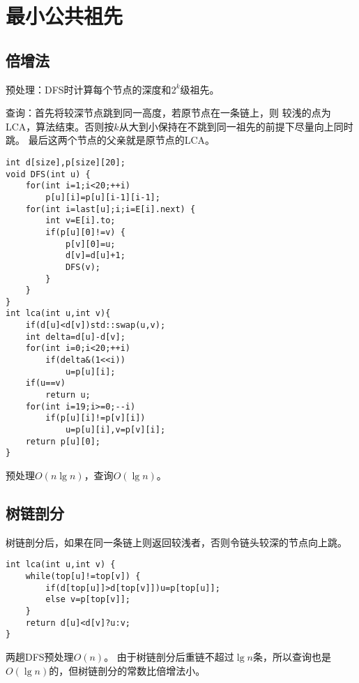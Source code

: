 \section{最小公共祖先}
\subsection{倍增法}
预处理：DFS时计算每个节点的深度和$2^k$级祖先。

查询：首先将较深节点跳到同一高度，若原节点在一条链上，则
较浅的点为LCA，算法结束。否则按$k$从大到小保持在不跳到同一祖先的前提下尽量向上同时跳。
最后这两个节点的父亲就是原节点的LCA。

\begin{lstlisting}
int d[size],p[size][20];
void DFS(int u) {
    for(int i=1;i<20;++i)
        p[u][i]=p[u][i-1][i-1];
    for(int i=last[u];i;i=E[i].next) {
        int v=E[i].to;
        if(p[u][0]!=v) {
            p[v][0]=u;
            d[v]=d[u]+1;
            DFS(v);
        }
    }
}
int lca(int u,int v){
    if(d[u]<d[v])std::swap(u,v);
    int delta=d[u]-d[v];
    for(int i=0;i<20;++i)
        if(delta&(1<<i))
            u=p[u][i];
    if(u==v)
        return u;
    for(int i=19;i>=0;--i)
        if(p[u][i]!=p[v][i])
            u=p[u][i],v=p[v][i];
    return p[u][0];
}
\end{lstlisting}
预处理$O(n\lg n)$，查询$O(\lg n)$。
\subsection{树链剖分}
树链剖分后，如果在同一条链上则返回较浅者，否则令链头较深的节点向上跳。

\begin{lstlisting}
int lca(int u,int v) {
    while(top[u]!=top[v]) {
        if(d[top[u]]>d[top[v]])u=p[top[u]];
        else v=p[top[v]];
    }
    return d[u]<d[v]?u:v;
}
\end{lstlisting}

两趟DFS预处理$O(n)$。
由于树链剖分后重链不超过$\lg n$条，所以查询也是$O(\lg n)$的，但树链剖分的常数比倍增法小。
